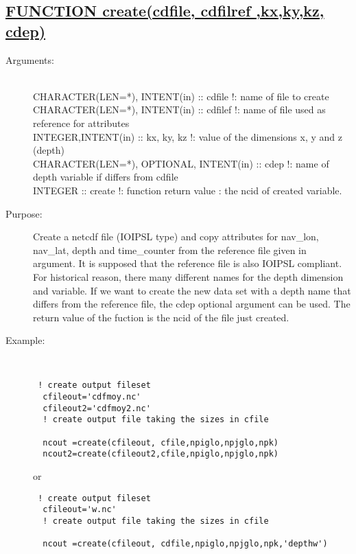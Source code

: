 \documentclass[a4paper,11pt]{article}
\begin{document}
\subsection*{\underline{ FUNCTION create(cdfile, cdfilref ,kx,ky,kz, cdep) }}
\begin{description}
\item[Arguments:]\ \\
CHARACTER(LEN=*), INTENT(in) :: cdfile    !: name of file to create \\
CHARACTER(LEN=*), INTENT(in) :: cdfilef   !: name of file used as reference for attributes \\
INTEGER,INTENT(in) :: kx, ky, kz  !: value of the dimensions x, y and z (depth) \\
CHARACTER(LEN=*), OPTIONAL, INTENT(in) :: cdep !: name of depth variable if differs from cdfile\\
INTEGER            :: create      !: function return value : the ncid of created variable.
\item[Purpose:] Create a netcdf file (IOIPSL type) and copy attributes for nav\_lon, nav\_lat, depth and time\_counter
from the reference file given in argument. It is supposed that the reference file is also IOIPSL compliant. For historical
reason, there many different names for the depth dimension and variable. If we want to create the new data set with a depth
name that differs from the reference file, the cdep optional argument can be used.
The return value of the fuction is the ncid of the file just created.
\item[Example:] \ \\
\begin{verbatim}
 ! create output fileset 
  cfileout='cdfmoy.nc' 
  cfileout2='cdfmoy2.nc' 
  ! create output file taking the sizes in cfile  
  
  ncout =create(cfileout, cfile,npiglo,npjglo,npk) 
  ncout2=create(cfileout2,cfile,npiglo,npjglo,npk) 
\end{verbatim}
or
\begin{verbatim}
 ! create output fileset 
  cfileout='w.nc' 
  ! create output file taking the sizes in cfile  
  
  ncout =create(cfileout, cdfile,npiglo,npjglo,npk,'depthw') 
\end{verbatim}

\end{description}
\newpage
\end{document}
